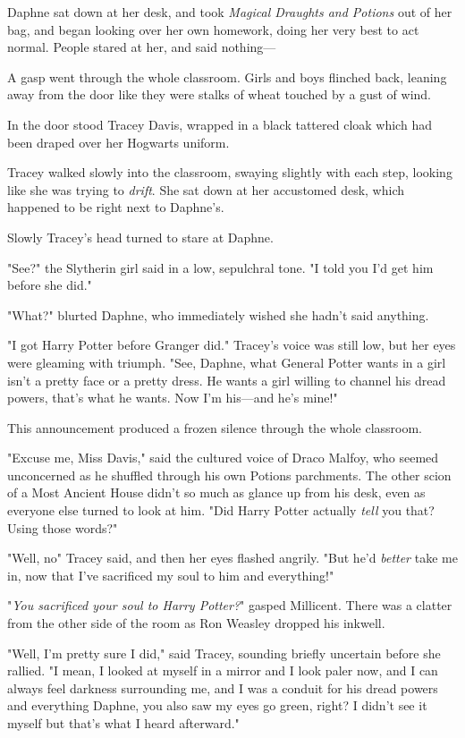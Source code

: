 Daphne sat down at her desk, and took \emph{Magical Draughts and Potions} out
of her bag, and began looking over her own homework, doing her very best to act
normal. People stared at her, and said nothing---

A gasp went through the whole classroom. Girls and boys flinched back, leaning
away from the door like they were stalks of wheat touched by a gust of wind.

In the door stood Tracey Davis, wrapped in a black tattered cloak which had
been draped over her Hogwarts uniform.

Tracey walked slowly into the classroom, swaying slightly with each step,
looking like she was trying to \emph{drift}. She sat down at her accustomed
desk, which happened to be right next to Daphne's.

Slowly Tracey's head turned to stare at Daphne.

"See?" the Slytherin girl said in a low, sepulchral tone. "I told you I'd get
him before she did."

"What?" blurted Daphne, who immediately wished she hadn't said anything.

"I got Harry Potter before Granger did." Tracey's voice was still low, but her
eyes were gleaming with triumph. "See, Daphne, what General Potter wants in a
girl isn't a pretty face or a pretty dress. He wants a girl willing to channel
his dread powers, that's what he wants. Now I'm his---and he's mine!"

This announcement produced a frozen silence through the whole classroom.

"Excuse me, Miss Davis," said the cultured voice of Draco Malfoy, who seemed
unconcerned as he shuffled through his own Potions parchments. The other scion
of a Most Ancient House didn't so much as glance up from his desk, even as
everyone else turned to look at him. "Did Harry Potter actually \emph{tell} you
that? Using those words?"

"Well, no{\el}" Tracey said, and then her eyes flashed angrily. "But he'd
\emph{better} take me in, now that I've sacrificed my soul to him and
everything!"

"\emph{You sacrificed your soul to Harry Potter?}" gasped Millicent. There was
a clatter from the other side of the room as Ron Weasley dropped his inkwell.

"Well, I'm pretty sure I did," said Tracey, sounding briefly uncertain before
she rallied. "I mean, I looked at myself in a mirror and I look paler now, and
I can always feel darkness surrounding me, and I was a conduit for his dread
powers and everything{\el} Daphne, you also saw my eyes go green, right? I
didn't see it myself but that's what I heard afterward."

